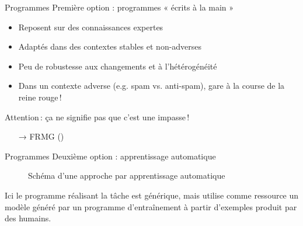 \documentclass[hyperref={unicode}, xcolor={svgnames}, french]{beamer}
\begin{document}
\begin{frame}{Programmes}
    Première option : programmes « écrits à la main »
    \begin{itemize}
        \item Reposent sur des connaissances expertes
        \item Adaptés dans des contextes stables et non-adverses
        \item Peu de robustesse aux changements et à l'hétérogénéité
        \item Dans un contexte adverse (e.g. spam vs. anti-spam), gare à la course de la reine rouge !
    \end{itemize}
    Attention : ça ne signifie pas que c'est une impasse !
    \begin{itemize}
        \item[→] FRMG ()
    \end{itemize}
\end{frame}

\begin{frame}[fragile=singleslide]{Programmes}
    Deuxième option : apprentissage automatique
    \begin{figure}
        \tikzset{external/export=true}
        \caption{Schéma d'une approche par apprentissage automatique}
    \end{figure}
    Ici le \textcolor{highlight0}{programme réalisant la tâche} est générique, mais utilise comme ressource un \textcolor{highlight3}{modèle} généré par un \textcolor{highlight6}{programme d'entraînement} à partir d'\textcolor{highlight7}{exemples} produit par des humains.
\end{frame}
\end{document}

